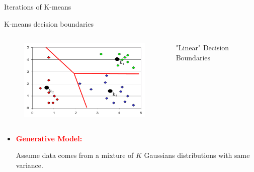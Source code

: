 \documentclass[12pt]{beamer}
\begin{document}
\begin{frame}{Iterations of K-means}
\begin{figure}
\end{figure}
\end{frame}

\begin{frame}{K-means decision boundaries}
\begin{columns}[c]
\column{8cm}
\begin{figure}
\includegraphics[width=7cm]{pics/kmean_decision_boundaries}
\end{figure}
\column{3cm}
"Linear" Decision Boundaries
\end{columns}
\begin{itemize}
	\item \textbf{\textcolor{red}{Generative Model:}}

	Assume data comes from a mixture of $K$ Gaussians distributions
	with same variance.
\end{itemize}
\end{frame}
\end{document}
